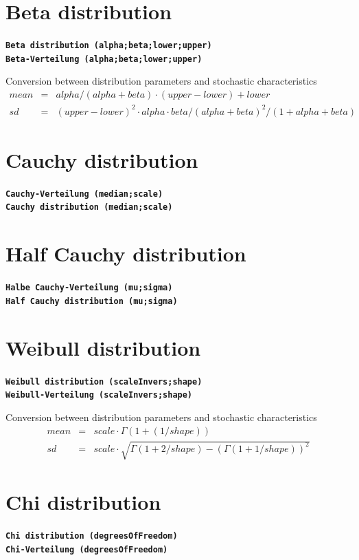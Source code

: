 \documentclass{svmono}
\def\cm#1{\textbf{\texttt{#1}}}
\begin{document}
\section*{Beta distribution}
\cm{Beta distribution (alpha;beta;lower;upper)}~\\
\cm{Beta-Verteilung (alpha;beta;lower;upper)}

Conversion between distribution parameters and stochastic characteristics
\begin{eqnarray*}
mean&=&alpha/(alpha+beta)\cdot(upper-lower)+lower\\
sd&=&(upper-lower)^2\cdot alpha\cdot beta/(alpha+beta)^2/(1+alpha+beta)
\end{eqnarray*}





\section*{Cauchy distribution}
\cm{Cauchy-Verteilung (median;scale)}~\\
\cm{Cauchy distribution (median;scale)}





\section*{Half Cauchy distribution}
\cm{Halbe Cauchy-Verteilung (mu;sigma)}~\\
\cm{Half Cauchy distribution (mu;sigma)}





\section*{Weibull distribution}
\cm{Weibull distribution (scaleInvers;shape)}~\\
\cm{Weibull-Verteilung (scaleInvers;shape)}

Conversion between distribution parameters and stochastic characteristics
\begin{eqnarray*}
mean&=&scale\cdot\Gamma(1+(1/shape))\\
sd&=&scale\cdot\sqrt{\Gamma(1+2/shape)-(\Gamma(1+1/shape))^2}
\end{eqnarray*}





\section*{Chi distribution}
\cm{Chi distribution (degreesOfFreedom)}~\\
\cm{Chi-Verteilung (degreesOfFreedom)}
\end{document}
